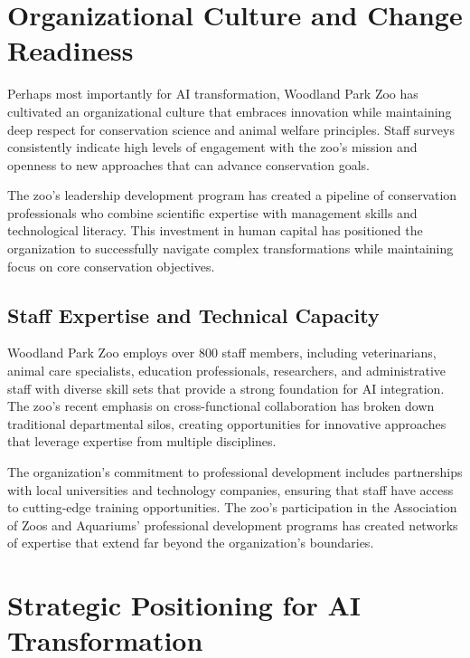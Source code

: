\documentclass[
  Letterpaper,
]{scrbook}
\begin{document}
\section{Organizational Culture and Change
Readiness}\label{organizational-culture-and-change-readiness}

Perhaps most importantly for AI transformation, Woodland Park Zoo has
cultivated an organizational culture that embraces innovation while
maintaining deep respect for conservation science and animal welfare
principles. Staff surveys consistently indicate high levels of
engagement with the zoo's mission and openness to new approaches that
can advance conservation goals.

The zoo's leadership development program has created a pipeline of
conservation professionals who combine scientific expertise with
management skills and technological literacy. This investment in human
capital has positioned the organization to successfully navigate complex
transformations while maintaining focus on core conservation objectives.

\subsection{Staff Expertise and Technical
Capacity}\label{staff-expertise-and-technical-capacity}

Woodland Park Zoo employs over 800 staff members, including
veterinarians, animal care specialists, education professionals,
researchers, and administrative staff with diverse skill sets that
provide a strong foundation for AI integration. The zoo's recent
emphasis on cross-functional collaboration has broken down traditional
departmental silos, creating opportunities for innovative approaches
that leverage expertise from multiple disciplines.

The organization's commitment to professional development includes
partnerships with local universities and technology companies, ensuring
that staff have access to cutting-edge training opportunities. The zoo's
participation in the Association of Zoos and Aquariums' professional
development programs has created networks of expertise that extend far
beyond the organization's boundaries.

\section{Strategic Positioning for AI
Transformation}\label{strategic-positioning-for-ai-transformation}
\end{document}
